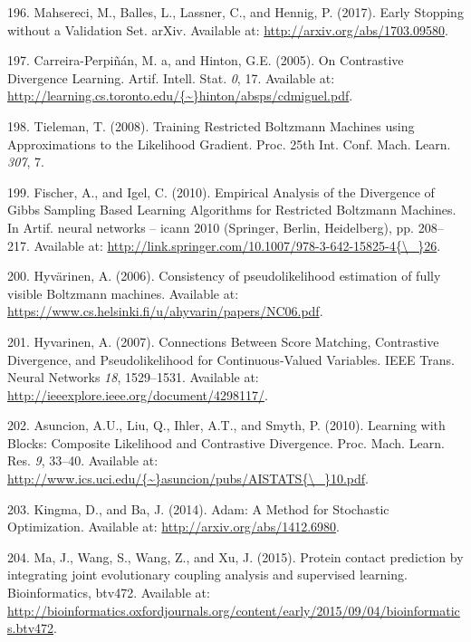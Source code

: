\documentclass[11pt,a4paper,twoside]{book}
\theoremstyle{definition}
\theoremstyle{definition}
\theoremstyle{remark}
\begin{document}
\hypertarget{ref-Mahsereci2017}{}
196. Mahsereci, M., Balles, L., Lassner, C., and Hennig, P. (2017).
Early Stopping without a Validation Set. arXiv. Available at:
\url{http://arxiv.org/abs/1703.09580}.

\hypertarget{ref-Carreira-Perpinan2005}{}
197. Carreira-Perpiñán, M. a, and Hinton, G.E. (2005). On Contrastive
Divergence Learning. Artif. Intell. Stat. \emph{0}, 17. Available at:
\href{http://learning.cs.toronto.edu/\%7B~\%7Dhinton/absps/cdmiguel.pdf}{http://learning.cs.toronto.edu/\{\textasciitilde{}\}hinton/absps/cdmiguel.pdf}.

\hypertarget{ref-Tieleman2008}{}
198. Tieleman, T. (2008). Training Restricted Boltzmann Machines using
Approximations to the Likelihood Gradient. Proc. 25th Int. Conf. Mach.
Learn. \emph{307}, 7.

\hypertarget{ref-Fischer2010}{}
199. Fischer, A., and Igel, C. (2010). Empirical Analysis of the
Divergence of Gibbs Sampling Based Learning Algorithms for Restricted
Boltzmann Machines. In Artif. neural networks -- icann 2010 (Springer,
Berlin, Heidelberg), pp. 208--217. Available at:
\href{http://link.springer.com/10.1007/978-3-642-15825-4\%7B/_\%7D26}{http://link.springer.com/10.1007/978-3-642-15825-4\{\textbackslash{}\_\}26}.

\hypertarget{ref-Hyvarinen2006}{}
200. Hyvärinen, A. (2006). Consistency of pseudolikelihood estimation of
fully visible Boltzmann machines. Available at:
\url{https://www.cs.helsinki.fi/u/ahyvarin/papers/NC06.pdf}.

\hypertarget{ref-Hyvarinen2007}{}
201. Hyvarinen, A. (2007). Connections Between Score Matching,
Contrastive Divergence, and Pseudolikelihood for Continuous-Valued
Variables. IEEE Trans. Neural Networks \emph{18}, 1529--1531. Available
at: \url{http://ieeexplore.ieee.org/document/4298117/}.

\hypertarget{ref-Asuncion2010}{}
202. Asuncion, A.U., Liu, Q., Ihler, A.T., and Smyth, P. (2010).
Learning with Blocks: Composite Likelihood and Contrastive Divergence.
Proc. Mach. Learn. Res. \emph{9}, 33--40. Available at:
\href{http://www.ics.uci.edu/\%7B~\%7Dasuncion/pubs/AISTATS\%7B/_\%7D10.pdf}{http://www.ics.uci.edu/\{\textasciitilde{}\}asuncion/pubs/AISTATS\{\textbackslash{}\_\}10.pdf}.

\hypertarget{ref-Kingma2014}{}
203. Kingma, D., and Ba, J. (2014). Adam: A Method for Stochastic
Optimization. Available at: \url{http://arxiv.org/abs/1412.6980}.

\hypertarget{ref-Ma2015a}{}
204. Ma, J., Wang, S., Wang, Z., and Xu, J. (2015). Protein contact
prediction by integrating joint evolutionary coupling analysis and
supervised learning. Bioinformatics, btv472. Available at:
\url{http://bioinformatics.oxfordjournals.org/content/early/2015/09/04/bioinformatics.btv472}.
\end{document}
